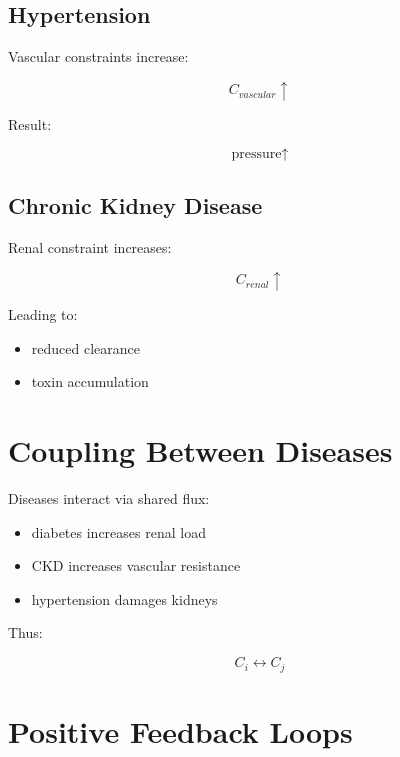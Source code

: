 \documentclass[11pt]{article}
\begin{document}
\subsection{Hypertension}

Vascular constraints increase:

\begin{equation}
C_{vascular} \uparrow
\end{equation}

Result:

\begin{equation}
\text{pressure} \uparrow
\end{equation}

\subsection{Chronic Kidney Disease}

Renal constraint increases:

\begin{equation}
C_{renal} \uparrow
\end{equation}

Leading to:

\begin{itemize}
    \item reduced clearance
    \item toxin accumulation
\end{itemize}

\section{Coupling Between Diseases}

Diseases interact via shared flux:

\begin{itemize}
    \item diabetes increases renal load
    \item CKD increases vascular resistance
    \item hypertension damages kidneys
\end{itemize}

Thus:

\begin{equation}
C_i \leftrightarrow C_j
\end{equation}

\section{Positive Feedback Loops}
\end{document}
